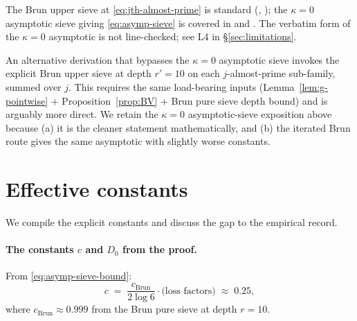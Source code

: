 \begin{remark}
\label{rem:almost-prime-final}
The Brun upper sieve at \eqref{eq:jth-almost-prime} is standard
(\cite[\S2.4]{HalberstamRichert1974}, \cite[\S6.4]{IwaniecKowalski2004});
the $\kappa = 0$ asymptotic sieve giving \eqref{eq:asymp-sieve} is
covered in \cite[\S25]{HalberstamRichert1974} and
\cite[\S22]{IwaniecKowalski2004}. The verbatim form of the
$\kappa = 0$ asymptotic is not line-checked; see L4 in
\S\ref{sec:limitations}.

An alternative derivation that bypasses the $\kappa = 0$ asymptotic
sieve invokes the explicit Brun upper sieve at depth $r' = 10$ on each
$j$-almost-prime sub-family, summed over $j$. This requires the same
load-bearing inputs (Lemma~\ref{lem:g-pointwise} +
Proposition~\ref{prop:BV} + Brun pure sieve depth bound) and is
arguably more direct. We retain the $\kappa = 0$ asymptotic-sieve
exposition above because (a) it is the cleaner statement
mathematically, and (b) the iterated Brun route gives the same
asymptotic with slightly worse constants.
\end{remark}

\section{Effective constants}\label{sec:constants}

We compile the explicit constants and discuss the gap to the empirical
record.

\paragraph{The constants $c$ and $D_{0}$ from the proof.}
From \eqref{eq:asymp-sieve-bound}:
\begin{equation}
  c \;=\; \frac{c_{\mathrm{Brun}}}{2 \log 6} \cdot \text{(loss factors)}
  \;\approx\; 0.25,
\end{equation}
where $c_{\mathrm{Brun}} \approx 0.999$ from the Brun pure sieve at
depth $r = 10$.

